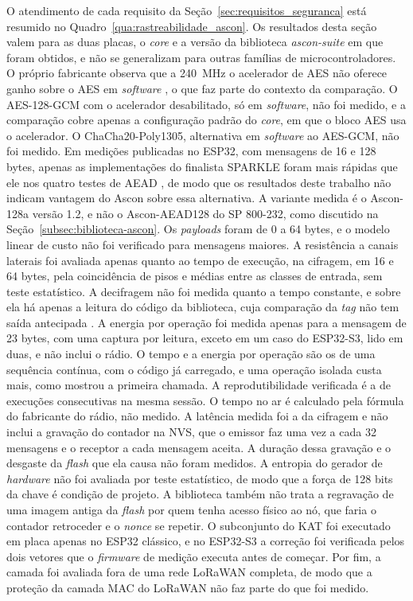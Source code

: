 O atendimento de cada requisito da Seção~\ref{sec:requisitos_seguranca} está resumido no Quadro~\ref{qua:rastreabilidade_ascon}. Os resultados desta seção valem para as duas placas, o \textit{core} e a versão da biblioteca \textit{ascon-suite} em que foram obtidos, e não se generalizam para outras famílias de microcontroladores. O próprio fabricante observa que a 240~MHz o acelerador de AES não oferece ganho sobre o AES em \textit{software} \cite{espressif2026idf}, o que faz parte do contexto da comparação. O AES-128-GCM com o acelerador desabilitado, só em \textit{software}, não foi medido, e a comparação cobre apenas a configuração padrão do \textit{core}, em que o bloco AES usa o acelerador. O ChaCha20-Poly1305, alternativa em \textit{software} ao AES-GCM, não foi medido. Em medições publicadas no ESP32, com mensagens de 16 e 128 bytes, apenas as implementações do finalista SPARKLE foram mais rápidas que ele nos quatro testes de AEAD \cite{nistir8454}, de modo que os resultados deste trabalho não indicam vantagem do Ascon sobre essa alternativa. A variante medida é o Ascon-128a versão 1.2, e não o Ascon-AEAD128 do SP 800-232, como discutido na Seção~\ref{subsec:biblioteca-ascon}. Os \textit{payloads} foram de 0 a 64 bytes, e o modelo linear de custo não foi verificado para mensagens maiores. A resistência a canais laterais foi avaliada apenas quanto ao tempo de execução, na cifragem, em 16 e 64 bytes, pela coincidência de pisos e médias entre as classes de entrada, sem teste estatístico. A decifragem não foi medida quanto a tempo constante, e sobre ela há apenas a leitura do código da biblioteca, cuja comparação da \textit{tag} não tem saída antecipada \cite{weatherley2023ascon}. A energia por operação foi medida apenas para a mensagem de 23 bytes, com uma captura por leitura, exceto em um caso do ESP32-S3, lido em duas, e não inclui o rádio. O tempo e a energia por operação são os de uma sequência contínua, com o código já carregado, e uma operação isolada custa mais, como mostrou a primeira chamada. A reprodutibilidade verificada é a de execuções consecutivas na mesma sessão. O tempo no ar é calculado pela fórmula do fabricante do rádio, não medido. A latência medida foi a da cifragem e não inclui a gravação do contador na NVS, que o emissor faz uma vez a cada 32 mensagens e o receptor a cada mensagem aceita. A duração dessa gravação e o desgaste da \textit{flash} que ela causa não foram medidos. A entropia do gerador de \textit{hardware} não foi avaliada por teste estatístico, de modo que a força de 128 bits da chave é condição de projeto. A biblioteca também não trata a regravação de uma imagem antiga da \textit{flash} por quem tenha acesso físico ao nó, que faria o contador retroceder e o \textit{nonce} se repetir. O subconjunto do KAT foi executado em placa apenas no ESP32 clássico, e no ESP32-S3 a correção foi verificada pelos dois vetores que o \textit{firmware} de medição executa antes de começar. Por fim, a camada foi avaliada fora de uma rede LoRaWAN completa, de modo que a proteção da camada MAC do LoRaWAN não faz parte do que foi medido.
